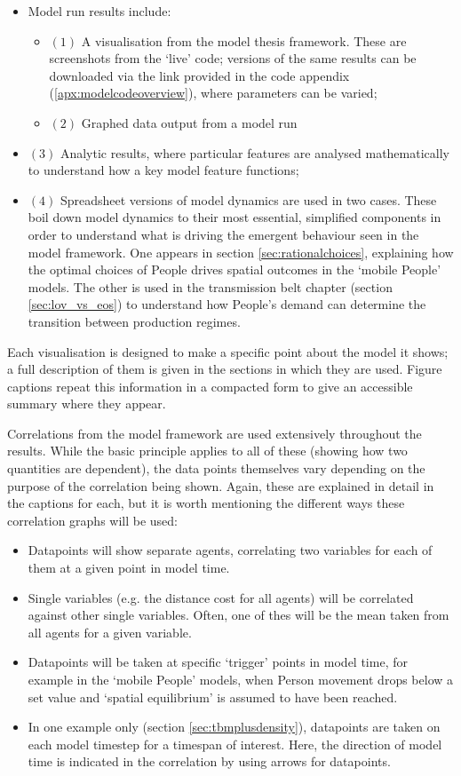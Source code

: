 \begin{itemize}
	\item Model run results include:
\begin{itemize}
	\item $(1)$ A visualisation from the model thesis framework. These are screenshots from the `live' code; versions of the same results can be downloaded via the link provided in the code appendix (\ref{apx:modelcodeoverview}), where parameters can be varied;
	\item	$(2)$ Graphed data output from a model run
\end{itemize}
	\item $(3)$ Analytic results, where particular features are analysed mathematically to understand how a key model feature functions;
	\item $(4)$ Spreadsheet versions of model dynamics are used in two cases. These boil down model dynamics to their most essential, simplified components in order to understand what is driving the emergent behaviour seen in the model framework. One appears in section \ref{sec:rationalchoices}, explaining how the optimal choices of People drives spatial outcomes in the `mobile People' models. The other is used in the transmission belt chapter (section \ref{sec:lov_vs_eos}) to understand how People's demand can determine the transition between production regimes.
\end{itemize}

Each visualisation is designed to make a specific point about the model it shows; a full description of them is given in the sections in which they are used. Figure captions repeat this information in a compacted form to give an accessible summary where they appear. 

Correlations from the model framework are used extensively throughout the results. While the basic principle applies to all of these (showing how two quantities are dependent), the data points themselves vary depending on the purpose of the correlation being shown. Again, these are explained in detail in the captions for each, but it is worth mentioning the different ways these correlation graphs will be used:

\begin{itemize}
	\item Datapoints will show separate agents, correlating two variables for each of them at a given point in model time.
	\item Single variables (e.g. the distance cost for all agents) will be correlated against other single variables. Often, one of thes will be the mean taken from all agents for a given variable.
	\item Datapoints will be taken at specific `trigger' points in model time, for example in the `mobile People' models, when Person movement drops below a set value and `spatial equilibrium' is assumed to have been reached.
	\item In one example only (section \ref{sec:tbmplusdensity}), datapoints are taken on each model timestep for a timespan of interest. Here, the direction of model time is indicated in the correlation by using arrows for datapoints.
\end{itemize}

